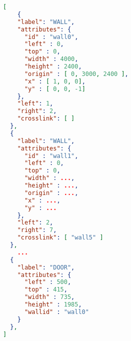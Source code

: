 \documentclass[11pt]{scrartcl}
\begin{document}
\begin{lstlisting}[language=json,firstnumber=1,basicstyle=\small]
[
	{
    "label": "WALL",
    "attributes": {
      "id" : "wall0",
      "left" : 0,
      "top" : 0,
      "width" : 4000,
      "height" : 2400,
      "origin" : [ 0, 3000, 2400 ],
      "x" : [ 1, 0, 0],
      "y" : [ 0, 0, -1]
    },
    "left": 1,
    "right": 2,
    "crosslink": [ ]
  },
  {
    "label": "WALL",
    "attributes": {
      "id" : "wall1",
      "left" : 0,
      "top" : 0,
      "width" : ...,
      "height" : ...,
      "origin" : ...,
      "x" : ...,
      "y" : ...
    },
    "left": 2,
    "right": 7,
    "crosslink": [ "wall5" ]
  },
	...	
  {
    "label": "DOOR",
    "attributes": {
      "left" : 500,
      "top" : 415,
      "width" : 735,
      "height" : 1985,
      "wallid" : "wall0"
    }
  },	
]
	
\end{lstlisting}

 
\end{document}
